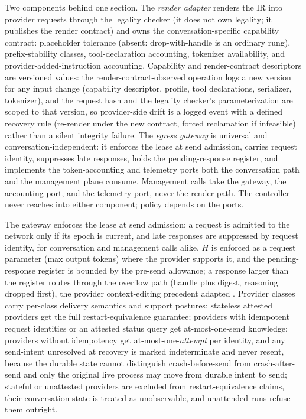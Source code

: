 \documentclass[11pt]{article}
\begin{document}
Two components behind one section. The \emph{render adapter} renders the IR into provider requests through the legality checker (it does not own legality; it publishes the render contract) and owns the conversation-specific capability contract: placeholder tolerance (absent: drop-with-handle is an ordinary rung), prefix-stability classes, tool-declaration accounting, tokenizer availability, and provider-added-instruction accounting. Capability and render-contract descriptors are versioned values: the render-contract-observed operation logs a new version for any input change (capability descriptor, profile, tool declarations, serializer, tokenizer), and the request hash and the legality checker's parameterization are scoped to that version, so provider-side drift is a logged event with a defined recovery rule (re-render under the new contract, forced reclamation if infeasible) rather than a silent integrity failure. The \emph{egress gateway} is universal and conversation-independent: it enforces the lease at send admission, carries request identity, suppresses late responses, holds the pending-response register, and implements the token-accounting and telemetry ports both the conversation path and the management plane consume. Management calls take the gateway, the accounting port, and the telemetry port, never the render path. The controller never reaches into either component; policy depends on the ports.

The gateway enforces the lease at send admission: a request is admitted to the network only if its epoch is current, and late responses are suppressed by request identity, for conversation and management calls alike. $H$ is enforced as a request parameter (max output tokens) where the provider supports it, and the pending-response register is bounded by the pre-send allowance; a response larger than the register routes through the overflow path (handle plus digest, reasoning dropped first), the provider context-editing precedent adapted \cite{anthropic2026docs}. Provider classes carry per-class delivery semantics and support postures: stateless attested providers get the full restart-equivalence guarantee; providers with idempotent request identities or an attested status query get at-most-one-send knowledge; providers without idempotency get at-most-one-\emph{attempt} per identity, and any send-intent unresolved at recovery is marked indeterminate and never resent, because the durable state cannot distinguish crash-before-send from crash-after-send and only the original live process may move from durable intent to send; stateful or unattested providers are excluded from restart-equivalence claims, their conversation state is treated as unobservable, and unattended runs refuse them outright.
\end{document}

